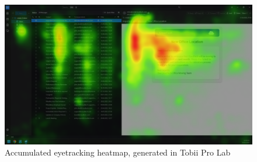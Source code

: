 \documentclass[
  a4paper,  %
  twoside,  %
  bibliography=totoc,
  headsepline,
  cleardoublepage=empty,
  parskip=half,
  draft=false
]{scrbook}
\begin{document}
\begin{figure} [ht]
    \centering
    \includegraphics[width=1\linewidth]{figures/heatmap_overlay.png}
    \caption{Accumulated eyetracking heatmap, generated in Tobii Pro Lab}
    \label{fig:heatmap}
\end{figure}

%

\pagestyle{empty}
\renewcommand*{\chapterpagestyle}{empty}
\Affirmation
\end{document}
